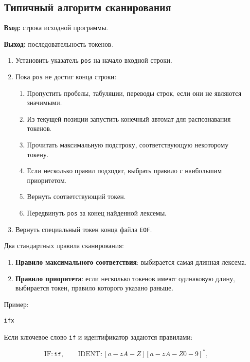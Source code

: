 \documentclass[12pt,a4paper]{article}
\begin{document}
\subsection{Типичный алгоритм сканирования}

\textbf{Вход:} строка исходной программы.

\textbf{Выход:} последовательность токенов.

\begin{enumerate}
    \item Установить указатель \texttt{pos} на начало входной строки.
    \item Пока \texttt{pos} не достиг конца строки:
    \begin{enumerate}
        \item Пропустить пробелы, табуляции, переводы строк, если они не являются значимыми.
        \item Из текущей позиции запустить конечный автомат для распознавания токенов.
        \item Прочитать максимальную подстроку, соответствующую некоторому токену.
        \item Если несколько правил подходят, выбрать правило с наибольшим приоритетом.
        \item Вернуть соответствующий токен.
        \item Передвинуть \texttt{pos} за конец найденной лексемы.
    \end{enumerate}
    \item Вернуть специальный токен конца файла \texttt{EOF}.
\end{enumerate}

Два стандартных правила сканирования:

\begin{enumerate}
    \item \textbf{Правило максимального соответствия}:
    выбирается самая длинная лексема.
    \item \textbf{Правило приоритета}:
    если несколько токенов имеют одинаковую длину, выбирается токен, правило которого указано раньше.
\end{enumerate}

Пример:

\begin{lstlisting}
ifx
\end{lstlisting}

Если ключевое слово \texttt{if} и идентификатор задаются правилами:

\[
\mathrm{IF}: \texttt{if},
\qquad
\mathrm{IDENT}: [a-zA-Z][a-zA-Z0-9]^*,
\]
\end{document}
